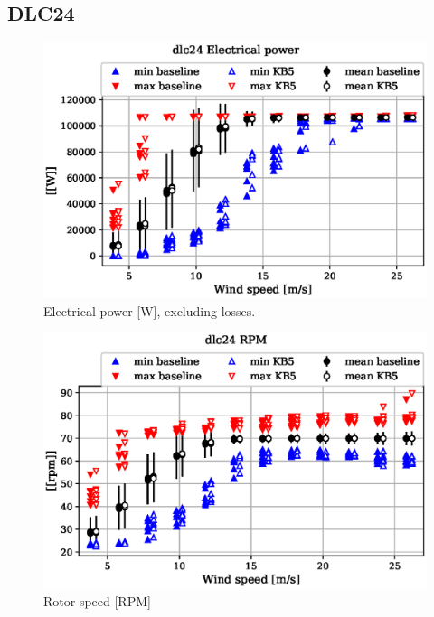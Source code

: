 
\subsection{DLC24}
\label{sec:baseline-vs-KB6:dlc24}

\begin{figure}[!ht]
\begin{center}
	\includegraphics[width=.85\linewidth]{figures/baseline-vs-KB6/dlc24/DLL-generator_servo-inpvec-2_AA0007_AA0003.eps}
\end{center}
\caption{Electrical power [W], excluding losses.}
\label{fig:baseline-vs-KB6:dlc24:power}
\end{figure}

\begin{figure}[!ht]
\begin{center}
	\includegraphics[width=.85\linewidth]{figures/baseline-vs-KB6/dlc24/bearing-shaft_rot-angle_speed-rpm_AA0007_AA0003.eps}
\end{center}
\caption{Rotor speed [RPM]}
\label{fig:baseline-vs-KB6:dlc24:rpm}
\end{figure}

